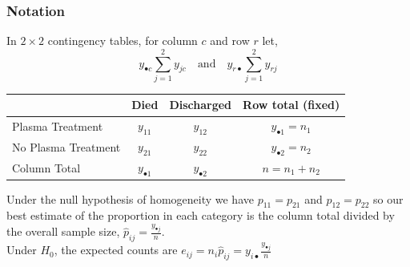 \documentclass[a4paper]{article}\usepackage[]{graphicx}\usepackage[]{xcolor}
\begin{document}
\subsubsection{Notation}
In \( 2 \times 2 \) contingency tables, for column \( c \) and row \( r \) let,
\[
	y_{\bullet c} \sum_{j=1}^{2} y_{jc} \quad\text{and}\quad y_{r \bullet} \sum_{j=1}^{2} y_{rj}
\]
\begin{table}[H]
	\centering
	\begin{tabular}{@{}lccc@{}}
	\toprule
						& Died                & Discharged          & Row total (fixed)         \\ \midrule
	Plasma Treatment    & \( y_{11} \)        & \( y_{12} \)        & \( y_{\bullet 1} = n_1 \) \\
	No Plasma Treatment & \( y_{21} \)        & \( y_{22} \)        & \( y_{\bullet 2} = n_2 \) \\ \midrule
	Column Total        & \( y_{\bullet 1} \) & \( y_{\bullet 2} \) & \( n = n_1 + n_2 \)       \\ \bottomrule
	\end{tabular}
\end{table}
Under the null hypothesis of homogeneity we have  \( p_{11} = p_{21} \) and \( p_{12} = p_{22} \)  so our best estimate of the proportion in each category is the column total divided by the overall sample size, \( \hat{p}_{ij} = \frac{y_{\bullet j}}{n} \).\\
Under \( H_0 \), the expected counts are \( e_{ij} = n_i \hat{p}_{ij} = y_{i \bullet} \frac{y_{\bullet j}}{n} \) 
\end{document}
